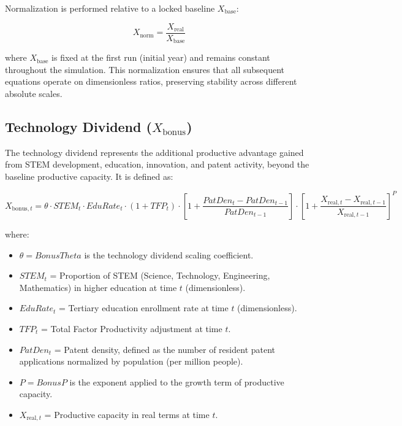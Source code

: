 \documentclass[12pt,a4paper]{article}
\begin{document}
Normalization is performed relative to a locked baseline $X_{\mathrm{base}}$:

\begin{equation}
X_{\mathrm{norm}} = \frac{X_{\mathrm{real}}}{X_{\mathrm{base}}}
\end{equation}

\noindent where $X_{\mathrm{base}}$ is fixed at the first run (initial year) and remains constant throughout the simulation. This normalization ensures that all subsequent equations operate on dimensionless ratios, preserving stability across different absolute scales.
\subsection{Technology Dividend (\texorpdfstring{$X_{\mathrm{bonus}}$}{Xbonus})}

The technology dividend represents the additional productive advantage gained from 
STEM development, education, innovation, and patent activity, beyond the baseline 
productive capacity. It is defined as:

\begin{equation}
X_{\mathrm{bonus},t} = \theta \cdot STEM_t \cdot EduRate_t \cdot (1 + TFP_t) 
 \cdot \left[ 1 + \frac{PatDen_t - PatDen_{t-1}}{PatDen_{t-1}} \right]
 \cdot \left[ 1 + \frac{X_{\mathrm{real},t} - X_{\mathrm{real},t-1}}{X_{\mathrm{real},t-1}} \right]^{P}
\end{equation}

\noindent where:
\begin{itemize}
    \item $\theta = BonusTheta$ is the technology dividend scaling coefficient.
    \item $STEM_t$ = Proportion of STEM (Science, Technology, Engineering, Mathematics) in higher education at time $t$ (dimensionless).
    \item $EduRate_t$ = Tertiary education enrollment rate at time $t$ (dimensionless).
    \item $TFP_t$ = Total Factor Productivity adjustment at time $t$.
    \item $PatDen_t$ = Patent density, defined as the number of resident patent applications normalized by population (per million people).
    \item $P = BonusP$ is the exponent applied to the growth term of productive capacity.
    \item $X_{\mathrm{real},t}$ = Productive capacity in real terms at time $t$.
\end{itemize}
\end{document}
